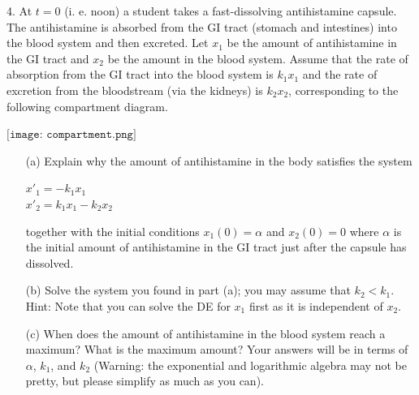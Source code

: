 \documentclass[12pt,letterpaper]{hmcpset}
\begin{document}
\begin{problem}
4. At $t = 0$ (i. e. noon) a student takes a fast-dissolving antihistamine capsule. The antihistamine
is absorbed from the GI tract (stomach and intestines) into the blood system and
then excreted. Let $x_1$ be the amount of antihistamine in the GI tract and $x_2$ be the amount
in the blood system. Assume that the rate of absorption from the GI tract into the blood
system is $k_1x_1$ and the rate of excretion from the bloodstream (via the kidneys) is $k_2x_2$,
corresponding to the following compartment diagram.
\begin{center}
   $\texttt{[image: compartment.png]}$ 
\end{center}
\begin{enumerate}
    \item[(a)] Explain why the amount of antihistamine in the body satisfies the system
    \begin{center}
        $x'_1 = -k_1x_1$\\
        $x'_2 = k_1x_1 - k_2x_2$
    \end{center}
    together with the initial conditions $x_1(0) = \alpha$ and $x_2(0)=0$ where $\alpha$ is the initial
amount of antihistamine in the GI tract just after the capsule has dissolved.
    \item[(b)] Solve the system you found in part (a); you may assume that $k_2 < k_1$.\\
Hint: Note that you can solve the DE for $x_1$ first as it is independent of $x_2$.
    \item[(c)] When does the amount of antihistamine in the blood system reach a maximum? What
is the maximum amount? Your answers will be in terms of $\alpha$, $k_1$, and $k_2$ (Warning: the
exponential and logarithmic algebra may not be pretty, but please simplify as much as
you can).
\end{enumerate}

\end{problem}
\newpage
\end{document}
